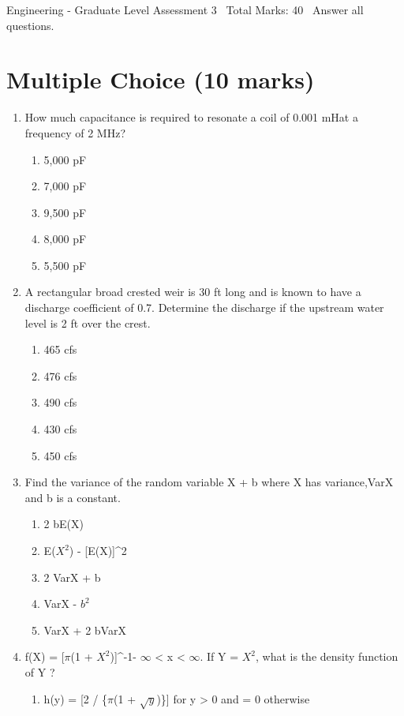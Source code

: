 \documentclass[12pt]{article}
\begin{document}
\begin{center}
Engineering - Graduate Level Assessment 3 \
Total Marks: 40 \
Answer all questions.
\end{center}

\section*{Multiple Choice (10 marks)}
\begin{enumerate}[label=\arabic*.]
\item How much capacitance is required to resonate a coil of 0.001 mHat a frequency of 2 MHz?
\begin{enumerate}[label=(\alph*)]
    \item 5,000 pF
    \item 7,000 pF
    \item 9,500 pF
    \item 8,000 pF
    \item 5,500 pF
\end{enumerate}
\item A rectangular broad crested weir is 30 ft long and is known to have a discharge coefficient of 0.7. Determine the discharge if the upstream water level is 2 ft over the crest.
\begin{enumerate}[label=(\alph*)]
    \item 465 cfs
    \item 476 cfs
    \item 490 cfs
    \item 430 cfs
    \item 450 cfs
\end{enumerate}
\item Find the variance of the random variable X + b where X has variance,VarX and b is a constant.
\begin{enumerate}[label=(\alph*)]
    \item 2 bE(X)
    \item E($X^2$) - [E(X)]^2
    \item 2 VarX + b
    \item VarX - $b^2$
    \item VarX + 2 bVarX
\end{enumerate}
\item f(X) = [\ensuremath{\pi}(1 + $X^2$)]^-1- \ensuremath{\infty} \textless{} x \textless{} \ensuremath{\infty}. If Y = $X^2$, what is the density function of Y ?
\begin{enumerate}[label=(\alph*)]
    \item h(y) = [2 / \{\ensuremath{\pi}(1 + \ensuremath{\sqrt{y}})\}] for y \textgreater{} 0 and = 0 otherwise

\end{enumerate}
\end{enumerate}
\end{document}
